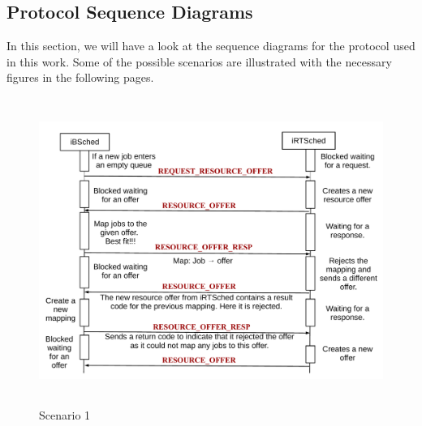 \subsection{Protocol Sequence Diagrams}
In this section, we will have a look at the sequence diagrams for the protocol used in this work. Some of the possible scenarios are illustrated with the necessary figures in the following pages.
\begin{figure}[!t]
\centering
\includegraphics[width=1.0\textwidth, height=100mm]{./figures/scenario1.pdf}
\caption{Scenario 1}
\label{fig:Seq1}
\end{figure}
